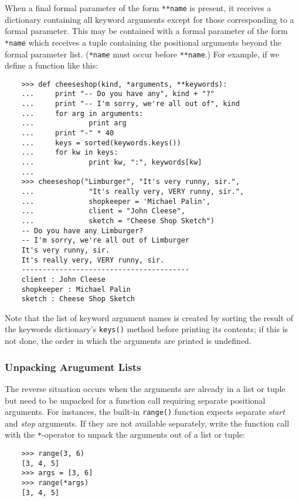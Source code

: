 \documentclass[UTF8]{article}
\begin{document}
When a final formal parameter of the form \texttt{**name} is present, it receives a dictionary
containing all keyword arguments except for those corresponding to a formal parameter. This may be
contained with a formal parameter of the form \texttt{*name} which receives a tuple containing the
positional arguments beyond the formal parameter list. (\texttt{*name} must occur before
\texttt{**name}.) For example, if we define a function like this:
\begin{verbatim}
    >>> def cheeseshop(kind, *arguments, **keywords):
    ...     print "-- Do you have any", kind + "?"
    ...     print "-- I'm sorry, we're all out of", kind
    ...     for arg in arguments:
    ...             print arg
    ...     print "-" * 40
    ...     keys = sorted(keywords.keys())
    ...     for kw in keys:
    ...             print kw, ":", keywords[kw]
    ...
    >>> cheeseshop("Limburger", "It's very runny, sir.",
    ...             "It's really very, VERY runny, sir.",
    ...             shopkeeper = 'Michael Palin',
    ...             client = "John Cleese",
    ...             sketch = "Cheese Shop Sketch")
    -- Do you have any Limburger?
    -- I'm sorry, we're all out of Limburger
    It's very runny, sir.
    It's really very, VERY runny, sir.
    ----------------------------------------
    client : John Cleese
    shopkeeper : Michael Palin
    sketch : Cheese Shop Sketch
\end{verbatim}

Note that the list of keyword argument names is created by sorting the result of the keywords
dictionary's \texttt{keys()} method before printing its contents; if this is not done, the order in
which the arguments are printed is undefined.

\subsubsection{Unpacking Arugument Lists}
The reverse situation occurs when the arguments are already in a list or tuple but need to be
unpacked for a function call requiring separate positional arguments. For instances, the built-in
\texttt{range()} function expects separate \emph{start} and \emph{stop} arguments. If they are not
available separately, write the function call with the \texttt{*}-operator to unpack the arguments
out of a list or tuple:
\begin{verbatim}
    >>> range(3, 6)
    [3, 4, 5]
    >>> args = [3, 6]
    >>> range(*args)
    [3, 4, 5]
\end{verbatim}
\end{document}
